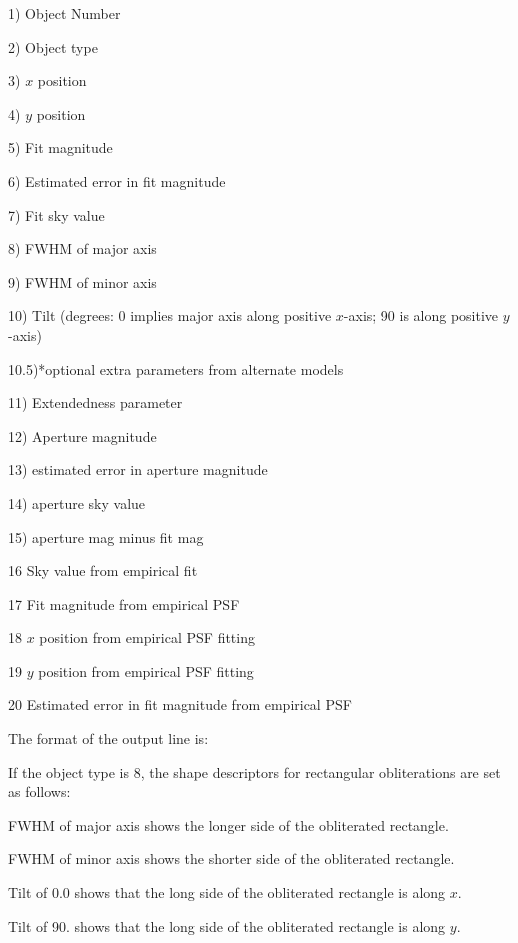 \item{1)} Object Number
\item{2)} Object type
\item{3)} $x$ position
\item{4)} $y$ position
\item{5)} Fit magnitude
\item{6)} Estimated error in fit magnitude
\item{7)} Fit sky value
\item{8)} FWHM of major axis
\item{9)} FWHM of minor axis
\item{10)} Tilt (degrees: 0 implies major axis along positive $x$-axis;
90 is along positive $y$-axis)
\item{10.5)}*optional extra parameters from alternate models
\item{11)} Extendedness parameter
\item{12)} Aperture magnitude  
\item{13)} estimated error in aperture magnitude
\item{14)} aperture sky value
\item{15)} aperture mag minus fit mag
\item{16} Sky value from empirical fit
\item{17} Fit magnitude from empirical PSF 
\item{18} $x$ position from empirical PSF fitting
\item{19} $y$ position from empirical PSF fitting
\item{20} Estimated error in fit magnitude from empirical PSF  

The format of the output line is:


If the object type is 8, the shape descriptors for rectangular obliterations are 
set as follows:

\noindent FWHM of 
major axis shows the longer side of the obliterated rectangle.

\noindent FWHM 
of minor axis shows the shorter side of the obliterated rectangle.

\noindent Tilt of 0.0 
shows that the long side of the obliterated rectangle is along $x$.

\noindent Tilt of 90. shows that the long side of the obliterated 
rectangle is along $y$.

